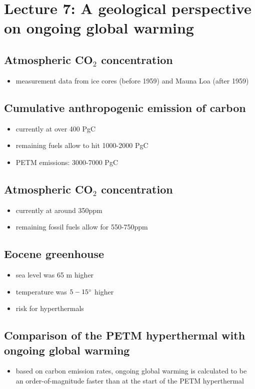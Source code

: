 \section{Lecture 7: A geological perspective on ongoing global warming}

\subsection{Atmospheric CO$_2$ concentration}

\begin{itemize}
	\item measurement data from ice cores (before 1959) and Mauna Loa
	(after 1959)
\end{itemize}

\subsection{Cumulative anthropogenic emission of carbon}
\begin{itemize}
	\item currently at over 400 PgC
	\item remaining fuels allow to hit 1000-2000 PgC
	\item PETM emissions: 3000-7000 PgC
\end{itemize}

\subsection{Atmospheric CO$_2$ concentration}
\begin{itemize}
	\item currently at around 350ppm
	\item remaining fossil fuels allow for 550-750ppm
\end{itemize}

\subsection{Eocene greenhouse}
\begin{itemize}
	\item sea level was 65 m higher
	\item temperature was $5-15\degree$ higher
	\item risk for hyperthermals
\end{itemize}

\subsection{Comparison of the PETM hyperthermal with ongoing global warming}
\begin{itemize}
	\item based on carbon emission rates, ongoing global warming is
	calculated to be an order-of-magnitude faster than at the start of the
	PETM hyperthermal
\end{itemize}

